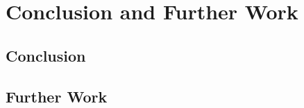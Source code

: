 \chapter{Conclusion and Further Work}
\label{chapter:conclusion}



\section{Conclusion}
\label{sec:conclusion}



\section{Further Work}
\label{sec:further-work}

